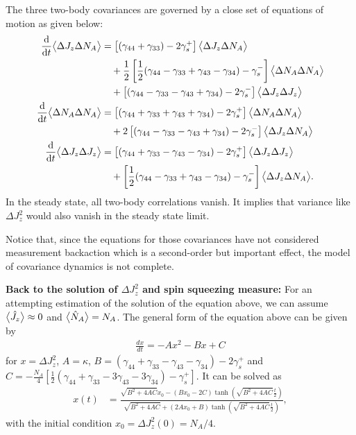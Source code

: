 The three two-body covariances are governed by a close set of equations of motion as given below:
\begin{align}
\frac{{\mathrm d} {}}{{\mathrm d}t} \big\langle \Delta J_z \Delta N_A \big\rangle &= \left[(\gamma_{44}+\gamma_{33})-2\gamma_s^+ \right] \big\langle \Delta J_z \Delta N_A \big\rangle \nonumber \\
&\quad +  \frac{1}{2} \left[\frac{1}{2}(\gamma_{44}-\gamma_{33}+\gamma_{43}-\gamma_{34})-\gamma_s^- \right]\big\langle \Delta N_A \Delta N_A \big\rangle\nonumber\\
&\quad + \left[(\gamma_{44}-\gamma_{33} - \gamma_{43}+\gamma_{34})-2\gamma_s^- \right]\big\langle \Delta J_z \Delta J_z \big\rangle\\
\frac{{\mathrm d} {}}{{\mathrm d}t} \big\langle \Delta N_A \Delta N_A \big\rangle &= \left[(\gamma_{44}+\gamma_{33}+\gamma_{43}+\gamma_{34})-2\gamma_s^+ \right]\big\langle \Delta N_A \Delta N_A \big\rangle\nonumber\\
&\quad +2 \left[(\gamma_{44}-\gamma_{33}-\gamma_{43}+\gamma_{34})-2\gamma_s^- \right]\big\langle \Delta J_z \Delta N_A \big\rangle\\
\frac{{\mathrm d} {}}{{\mathrm d}t}\big\langle \Delta J_z \Delta J_z \big\rangle &= \left[(\gamma_{44}+\gamma_{33}-\gamma_{43}-\gamma_{34})-2\gamma_s^+ \right]\big\langle \Delta J_z \Delta J_z \big\rangle\nonumber\\
&\quad +\left[\frac{1}{2}(\gamma_{44}-\gamma_{33}+\gamma_{43}-\gamma_{34})-\gamma_s^- \right]\big\langle \Delta J_z \Delta N_A \big\rangle.
\end{align}
In the steady state, all two-body correlations vanish.
It implies that variance like $ \Delta J_z^2 $ would also vanish in the steady state limit. 

Notice that, since the equations for those covariances have not considered measurement backaction which is a second-order but important effect, the model of covariance dynamics is not complete.


\textbf{Back to the solution of $ \Delta J_z^2 $ and spin squeezing measure:}
For an attempting estimation of the solution of the equation above, we can assume $ \big\langle \hat{J}_z \big\rangle\approx 0 $ and $ \big\langle \hat{N}_A \big\rangle=N_A $. 
The general form of the equation above can be given by
\begin{align}
	\frac{d x}{d t} = -A x^2 - B x + C
\end{align}
for $ x=\Delta J_z^2 $, $ A = \kappa $, $ B=(\gamma_{44}+\gamma_{33}-\gamma_{43}-\gamma_{34} ) -2\gamma_s^+ $ and $ C=-\frac{N_A}{4}\left[\frac{1}{2}(\gamma_{44}+\gamma_{33}-3\gamma_{43}-3\gamma_{34} ) -\gamma_s^+\right]  $. 
It can be solved as~\cite{Baragiola2014a}
\begin{align}
x(t)&  = \frac{ \sqrt{B^2 + 4 AC}x_0 - (Bx_0-2C) \tanh \left( \sqrt{B^2 + 4 AC}  \frac{t}{2} \right) }{\sqrt{B^2 + 4 AC} + (2Ax_0 + B) \tanh \left( \sqrt{B^2 + 4 AC}  \frac{t}{2} \right) } ,
\end{align}
with the initial condition $x_0=\Delta J_z^2(0)=N_A/4$. 

